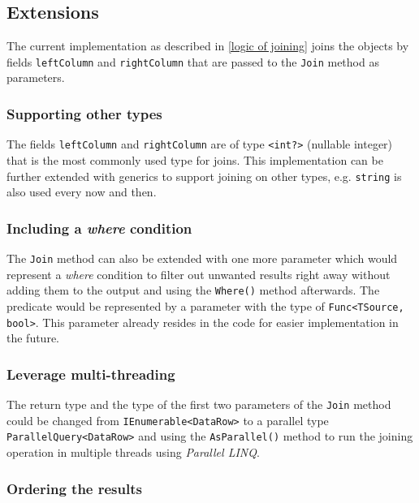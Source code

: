 \documentclass[
  print,
  table,
  nolof,
  nolot,
  nocover,
  oneside
]{fithesis3}
\begin{document}
\subsection{Extensions}
\label{extensions}

The current implementation as described in \autoref{logic of joining} joins the objects by fields \texttt{leftColumn} and \texttt{rightColumn} that are passed to the \texttt{Join} method as parameters.

\subsubsection{Supporting other types}

The fields \texttt{leftColumn} and \texttt{rightColumn} are of type \texttt{<int?>} (nullable integer)\parencite{nullable_int} that is the most commonly used type for joins. This implementation can be further extended with generics to support joining on other types, e.g. \texttt{string} is also used every now and then.

\subsubsection{Including a \textit{where} condition}

The \texttt{Join} method can also be extended with one more parameter which would represent a \textit{where} condition to filter out unwanted results right away without adding them to the output and using the \texttt{Where()} method afterwards. The predicate would be represented by a parameter with the type of \texttt{Func<TSource, bool>}. This parameter already resides in the code for easier implementation in the future.

\subsubsection{Leverage multi-threading}

The return type and the type of the first two parameters of the \texttt{Join} method could be changed from \texttt{IEnumerable<DataRow>} to a parallel type \texttt{ParallelQuery<DataRow>} and using the \texttt{AsParallel()} method to run the joining operation in multiple threads using \textit{Parallel LINQ}\parencite{linq}.

\subsubsection{Ordering the results}
\end{document}
